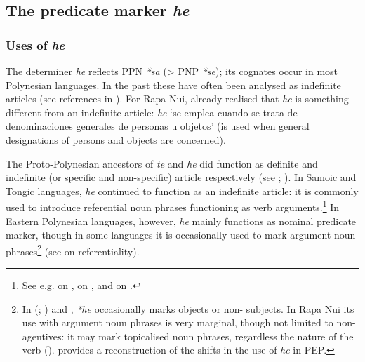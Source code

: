 \subsection{The predicate marker \textit{he}}\label{sec:5.3.4}
\subsubsection[Uses of he]{Uses of \textit{he}}\label{sec:5.3.4.1}

The determiner \textit{he} reflects PPN \textit{*sa} ({\textgreater} PNP \textit{*se}); its cognates occur in most Polynesian languages. In the past these have often been analysed as indefinite articles (see references in \citealt[230]{Polinsky1992}). For Rapa Nui, \citet[18]{Englert1978} already realised that \textit{he} is something different from an indefinite article: \textit{he} ‘se emplea cuando se trata de denominaciones generales de personas u objetos’ (is used when general designations of persons and objects are concerned). 

The Proto-Polynesian ancestors of \textit{te} and \textit{he} did function as definite and indefinite (or specific and non-specific) article respectively (see \citealt[47–50]{Clark1976}; \citealt[411]{Hamp1977}). In Samoic and Tongic languages, \textit{he} continued to function as an indefinite article: it is  commonly used to introduce referential noun phrases functioning as verb arguments.\footnote{\label{fn:255}See e.g. \citet[261–264]{MoselHovdhaugen1992} on , \citet[365]{Besnier2000} on , and \citet[22]{AndersonOtsuka2006} on .} In Eastern Polynesian languages, however, \textit{he} mainly functions as nominal predicate marker, though in some languages it is occasionally used to mark argument noun phrases\footnote{\label{fn:256}In  (\citealt{Polinsky1992}; \citealt{ChungMason1995}) and  \citep{Cook1999}, \textit{*he} occasionally marks objects or non- subjects. In Rapa Nui its use with argument noun phrases is very marginal, though not limited to non-agentives: it may mark topicalised noun phrases, regardless the nature of the verb (). \citet{Clark1997} provides a reconstruction of the shifts in the use of \textit{he} in PEP.} (see  on referentiality). 

